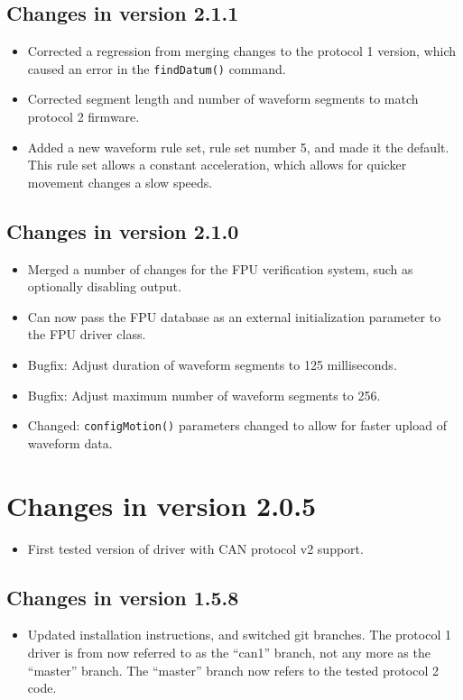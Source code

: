 \documentclass[fontsize=12,a4paper]{scrreprt}
\begin{document}
\subsection*{Changes in version 2.1.1}
\begin{itemize}
\item Corrected a regression from merging changes to the protocol 1
  version, which caused an error in the \texttt{findDatum()} command.
\item Corrected segment length and number of waveform segments
  to match protocol 2 firmware.
\item Added a new waveform rule set, rule set number 5, and made it
  the default. This rule set allows a constant acceleration, which
  allows for quicker movement changes a slow speeds.
\end{itemize}


\subsection*{Changes in version 2.1.0}
\begin{itemize}
\item Merged a number of changes for the FPU verification system,
  such as optionally disabling output.
\item Can now pass the FPU database as an external initialization
  parameter to the FPU driver class.
\item Bugfix: Adjust duration of waveform segments to 125 milliseconds.
\item Bugfix: Adjust maximum number of waveform segments to 256.
\item Changed: \texttt{configMotion()} parameters changed to allow for
  faster upload of waveform data.
\end{itemize}


\section*{Changes in version 2.0.5}
\begin{itemize}
\item First tested version of driver with CAN protocol v2 support.
\end{itemize}

\subsection*{Changes in version 1.5.8}
\begin{itemize}
\item Updated installation instructions, and switched git
  branches. The protocol 1 driver is from now referred to as the
  ``can1'' branch, not any more as the ``master'' branch. The
  ``master'' branch now refers to the tested protocol 2 code.
\end{itemize}
\end{document}
